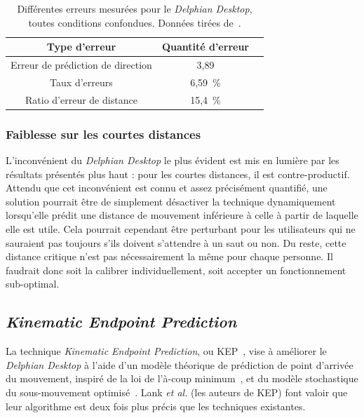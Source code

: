 \begin{appendices}
	\begin{table}
	\centering
	\begin{tabular}{c | c c }
		Type d'erreur						& Quantité d'erreur	\bigstrut[b] \\ \hline
		Erreur de prédiction de direction	& 3,89\textdegree	\bigstrut[t] \\
		Taux d'erreurs						& 6,59~\%{}			\\
		Ratio d'erreur de distance			& 15,4~\%{}			\\
	\end{tabular}
	\caption[\emph{Delphian Desktop} -- erreurs]{Différentes erreurs mesurées pour le \emph{Delphian Desktop}, toutes conditions confondues. Données tirées de~\cite{asano2005predictive}.}
	\label{tab:delphianErrors}
	\end{table}
	
	\subsubsection{Faiblesse sur les courtes distances}
	L'inconvénient du \emph{Delphian Desktop} le plus évident est mis en lumière par les résultats présentés plus haut : pour les courtes distances, il est contre-productif. Attendu que cet inconvénient est connu et assez précisément quantifié, une solution pourrait être de simplement désactiver la technique dynamiquement lorsqu'elle prédit une distance de mouvement inférieure à celle à partir de laquelle elle est utile. Cela pourrait cependant être perturbant pour les utilisateurs qui ne sauraient pas toujours s'ils doivent s'attendre à un \og saut \fg{} ou non. Du reste, cette distance critique n'est pas nécessairement la même pour chaque personne. Il faudrait donc soit la calibrer individuellement, soit accepter un fonctionnement sub-optimal.
	
	\subsection{\emph{Kinematic Endpoint Prediction}}
	\label{sub:kep}
	La technique \emph{Kinematic Endpoint Prediction}, ou KEP~\cite{lank2007endpoint}, vise à améliorer le \emph{Delphian Desktop} à l'aide d'un modèle théorique de prédiction de point d'arrivée du mouvement, inspiré de la loi de l'à-coup minimum~\cite{hogan1984organizing, richardson2002comparing}\footnotemark{}, et du modèle stochastique du sous-mouvement optimisé~\cite{meyer1990speed}. Lank \emph{et al.} (les auteurs de KEP) font valoir que leur algorithme est deux fois plus précis que les techniques existantes.
	

\end{appendices}
